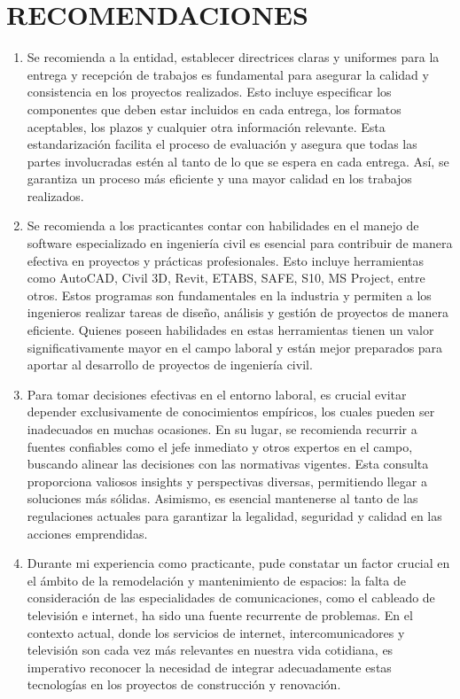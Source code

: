 \chapter{RECOMENDACIONES}
	\begin{enumerate}
		
		\item Se recomienda a la entidad, establecer directrices claras y uniformes para la entrega y recepción de trabajos es fundamental para asegurar la calidad y consistencia en los proyectos realizados. Esto incluye especificar los componentes que deben estar incluidos en cada entrega, los formatos aceptables, los plazos y cualquier otra información relevante. Esta estandarización facilita el proceso de evaluación y asegura que todas las partes involucradas estén al tanto de lo que se espera en cada entrega. Así, se garantiza un proceso más eficiente y una mayor calidad en los trabajos realizados.
		
		\item Se recomienda a los practicantes contar con habilidades en el manejo de software especializado en ingeniería civil es esencial para contribuir de manera efectiva en proyectos y prácticas profesionales. Esto incluye herramientas como AutoCAD, Civil 3D, Revit, ETABS, SAFE, S10, MS Project, entre otros. Estos programas son fundamentales en la industria y permiten a los ingenieros realizar tareas de diseño, análisis y gestión de proyectos de manera eficiente. Quienes poseen habilidades en estas herramientas tienen un valor significativamente mayor en el campo laboral y están mejor preparados para aportar al desarrollo de proyectos de ingeniería civil.
		
		\item Para tomar decisiones efectivas en el entorno laboral, es crucial evitar depender exclusivamente de conocimientos empíricos, los cuales pueden ser inadecuados en muchas ocasiones. En su lugar, se recomienda recurrir a fuentes confiables como el jefe inmediato y otros expertos en el campo, buscando alinear las decisiones con las normativas vigentes. Esta consulta proporciona valiosos insights y perspectivas diversas, permitiendo llegar a soluciones más sólidas. Asimismo, es esencial mantenerse al tanto de las regulaciones actuales para garantizar la legalidad, seguridad y calidad en las acciones emprendidas.
		\item Durante mi experiencia como practicante, pude constatar un factor crucial en el ámbito de la remodelación y mantenimiento de espacios: la falta de consideración de las especialidades de comunicaciones, como el cableado de televisión e internet, ha sido una fuente recurrente de problemas. En el contexto actual, donde los servicios de internet, intercomunicadores y televisión son cada vez más relevantes en nuestra vida cotidiana, es imperativo reconocer la necesidad de integrar adecuadamente estas tecnologías en los proyectos de construcción y renovación.
		
	\end{enumerate}